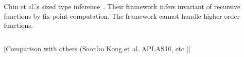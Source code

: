 Chin et al.'s sized type inference~\cite{Chin2003}.  Their framework
infers invariant of recursive functions by fix-point computation.  The
framework cannot handle higher-order functions.

\subsection{}
[Comparison with others (Soonho Kong et al. APLAS10, etc.)]

